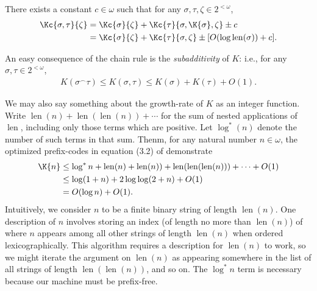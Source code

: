 \begin{theorem}
    \label{theorem:chain_rule_for_K}
    There exists a constant $c \in \omega$ such that for any $\sigma, \tau, \zeta \in 2^{<\omega}$, 
    \begin{align*}
        \Kc{\sigma, \tau}{\zeta} &= \Kc{\sigma}{\zeta} + \Kc{\tau}{\sigma, \K{\sigma}, \zeta} \pm c\\
        &= \Kc{\sigma}{\zeta} + \Kc{\tau}{\sigma, \zeta} \pm [O(\log \operatorname{len}(\sigma)) + c].
    \end{align*}
\end{theorem}

An easy consequence of the chain rule is the \textit{subadditivity} of $K$: i.e., for any $\sigma, \tau \in 2^{<\omega}$,
\begin{align*}
    K(\sigma^\smallfrown \tau) \leq K(\sigma, \tau) \leq K(\sigma) + K(\tau) + O(1).
\end{align*}

We may also say something about the growth-rate of $K$ as an integer function. Write $\operatorname{len}(n) + \operatorname{len}(\operatorname{len}(n)) + \cdots$ for the sum of nested applications of $\operatorname{len}$, including only those terms which are positive. Let $\log^*(n)$ denote the number of such terms in that sum. Thenm, for any natural number $n \in \omega$, the optimized prefix-codes in equation (3.2) of \cite{LV08} demonstrate
\begin{align}
    \K{n} &\leq \log^* n + \operatorname{len}(n) + \operatorname{len}(n)) + \operatorname{len}(\operatorname{len}(\operatorname{len}(n))) + \cdots + O(1) \label{equation:K_bound_for_naturals}\\
    &\leq \log(1 + n) + 2 \log \log (2 + n) + O(1) \nonumber\\
    &= O(\log n) + O(1) \nonumber.
\end{align}
Intuitively, we consider $n$ to be a finite binary string of length $\operatorname{len}(n)$. One description of $n$ involves storing an index (of length no more than $\operatorname{len}(n)$) of where $n$ appears among all other strings of length $\operatorname{len}(n)$ when ordered lexicographically. This algorithm requires a description for $\operatorname{len}(n)$ to work, so we might iterate the argument on $\operatorname{len}(n)$ as appearing somewhere in the list of all strings of length $\operatorname{len}(\operatorname{len}(n))$, and so on. The $\log^* n$ term is necessary because our machine must be prefix-free. 

